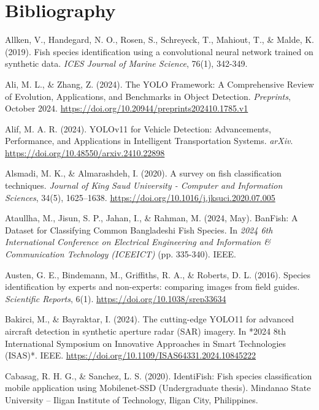 

\chapter{Bibliography}

\begin{bibliography}

 Allken, V., Handegard, N. O., Rosen, S., Schreyeck, T., Mahiout, T., \& Malde, K. (2019). Fish species identification using a convolutional neural network trained on synthetic data. \textit{ICES Journal of Marine Science}, 76(1), 342-349.

 Ali, M. L., \& Zhang, Z. (2024). The YOLO Framework: A Comprehensive Review of Evolution, Applications, and Benchmarks in Object Detection. \textit{Preprints}, October 2024. \url{https://doi.org/10.20944/preprints202410.1785.v1}

 Alif, M. A. R. (2024). YOLOv11 for Vehicle Detection: Advancements, Performance, and Applications in Intelligent Transportation Systems. \textit{arXiv}. \url{https://doi.org/10.48550/arxiv.2410.22898}

 Alsmadi, M. K., \& Almarashdeh, I. (2020). A survey on fish classification techniques. \textit{Journal of King Saud University - Computer and Information Sciences}, 34(5), 1625–1638. \url{https://doi.org/10.1016/j.jksuci.2020.07.005}

 Ataullha, M., Jisun, S. P., Jahan, I., \& Rahman, M. (2024, May). BanFish: A Dataset for Classifying Common Bangladeshi Fish Species. In \textit{2024 6th International Conference on Electrical Engineering and Information \& Communication Technology (ICEEICT)} (pp. 335-340). IEEE.

 Austen, G. E., Bindemann, M., Griffiths, R. A., \& Roberts, D. L. (2016). Species identification by experts and non-experts: comparing images from field guides. \textit{Scientific Reports}, 6(1). \url{https://doi.org/10.1038/srep33634}

 Bakirci, M., \& Bayraktar, I. (2024). The cutting-edge YOLO11 for advanced aircraft detection in synthetic aperture radar (SAR) imagery. In *2024 8th International Symposium on Innovative Approaches in Smart Technologies (ISAS)*. IEEE. \url{https://doi.org/10.1109/ISAS64331.2024.10845222}

 Cabasag, R. H. G., \& Sanchez, L. S. (2020). IdentiFish: Fish species classification mobile application using Mobilenet-SSD (Undergraduate thesis). Mindanao State University – Iligan Institute of Technology, Iligan City, Philippines.


\end{bibliography}
